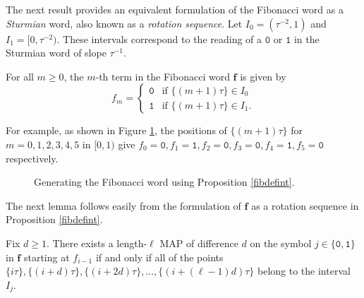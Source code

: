 \documentclass[10pt,a4paper,reqno]{amsart}
\newcommand{\bff}{{\mathbf f}}
\begin{document}
The next result provides an equivalent formulation of the Fibonacci word as a {\em Sturmian} word, also known as a \emph{rotation sequence}.
Let $I_0 = (\tau^{-2},1)$ and $I_1 = [0,\tau^{-2})$. These intervals correspond to the reading of a $\mathtt{0}$ or $\mathtt{1}$ in the Sturmian word of slope $\tau^{-1}$.
\begin{prop}\label{fibdefint}
    For all $m\geq0$, the $m$-th term in the Fibonacci word $\bff$ is given by
\[
f_m =
\begin{cases}
    \mathtt{0} & \text{if } \{ (m+1)\tau\}\in I_0\\
    \mathtt{1} & \text{if } \{ (m+1)\tau\}\in I_1.
\end{cases}
\]
\end{prop}
For example, as shown in Figure \ref{FIG:fibgenalgo}, the positions of $\{ (m+1)\tau\}$ for $m=0,1,2,3,4,5$ in $[0,1)$ give $f_0=\mathtt{0}, f_1=\mathtt{1}, f_2=\mathtt{0}, f_3=\mathtt{0}, f_4=\mathtt{1},f_5=\mathtt{0}$ respectively.
\begin{figure}[ht]
\centering
{}
\caption{Generating the Fibonacci word using Proposition \ref{fibdefint}.}
\label{FIG:fibgenalgo}
\end{figure}

The next lemma follows easily from the formulation of $\bff$ as a rotation sequence in Proposition \ref{fibdefint}. 
\begin{lem}\label{LEM:adobs}
Fix $d\geq1$. There exists a length-$\ell$ MAP of difference $d$ on the symbol $j\in\{\mathtt{0},\mathtt{1}\}$ in $\bff$ starting at $f_{i-1}$ if and only if all of the points $\{ i\tau\}, \{ (i+d)\tau\},  \{ (i+2d)\tau\},\ldots, \{ (i+(\ell -1)d)\tau\}$ belong to the interval $I_j$.
\end{lem}
\end{document}
